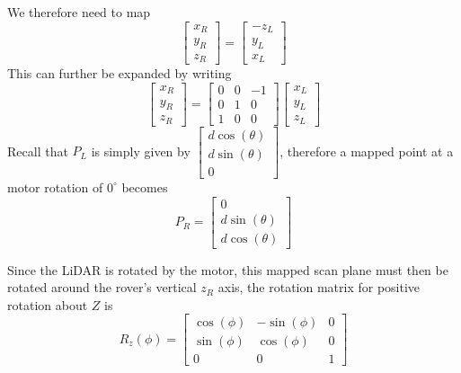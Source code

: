 We therefore need to map
\begin{equation}
    \begin{bmatrix}
        x_R \\
        y_R \\ 
        z_R 
    \end{bmatrix}
    =
    \begin{bmatrix}
        -z_L \\
        y_L \\
        x_L
    \end{bmatrix}
\end{equation}
This can further be expanded by writing
\begin{equation}
    \begin{bmatrix}
        x_R \\ 
        y_R \\ 
        z_R 
    \end{bmatrix}
    =
    \begin{bmatrix}
        0 & 0 & -1 \\
        0 & 1 & 0 \\
        1 & 0 & 0 
    \end{bmatrix}
    \begin{bmatrix}
        x_L \\ 
        y_L \\ 
        z_L 
    \end{bmatrix}
\end{equation}
Recall that \(P_L\) is simply given by \(\begin{bmatrix}
    d\cos(\theta) \\
    d\sin(\theta) \\
    0
\end{bmatrix}\), therefore a mapped point at a motor rotation of \(0^\circ\) becomes
\begin{equation}
    P_R = 
    \begin{bmatrix}
        0 \\
        d\sin(\theta) \\
        d\cos(\theta)
    \end{bmatrix}
\end{equation}

Since the LiDAR is rotated by the motor, this mapped scan plane must then be rotated around the rover's vertical \(z_R\) axis, the rotation matrix for positive rotation about \(Z\) is
\begin{equation}
    R_z(\phi) = 
    \begin{bmatrix}
        \cos(\phi) & -\sin(\phi) & 0 \\
        \sin(\phi) & \cos(\phi) & 0 \\
        0 & 0 & 1
    \end{bmatrix}
\end{equation}

